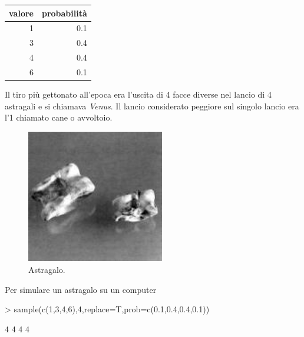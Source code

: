 \documentclass[onecolumn,12pt]{book}
\begin{document}
\begin{center}\begin{tabular}{|r|r |}
\hline
 valore&  probabilit\`a \\
\hline
1&0.1\\
3 &0.4\\
4& 0.4\\
6&0.1\\
 \hline
\end{tabular}
\end{center}
Il tiro pi\`u gettonato all'epoca era l'uscita di 4 facce diverse nel lancio di 4 astragali e si chiamava {\it Venus}.
Il lancio considerato peggiore sul singolo lancio era l'1 chiamato cane o avvoltoio.
\begin{figure}[htbp]
\begin{center}
\includegraphics[width=6cm]{../grafici/astragals.jpeg}
\caption{ Astragalo. }
\label{fig:daiist}
\end{center}
\end{figure}
Per simulare un astragalo su un computer
\begin{Schunk}
\begin{Sinput}
> sample(c(1,3,4,6),4,replace=T,prob=c(0.1,0.4,0.4,0.1))
\end{Sinput}
\begin{Soutput}
[1] 4 4 4 4
\end{Soutput}
\end{Schunk}
\end{document}
